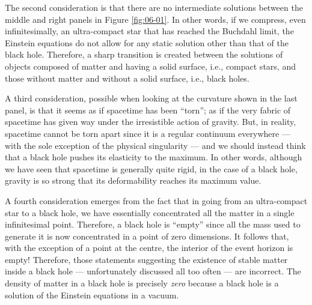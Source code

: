 The second consideration is that there are no intermediate solutions between the middle
and right panels in Figure \ref{fig:06-01}. In other words, if we compress, even infinitesimally, an
ultra-compact star that has reached the Buchdahl limit, the Einstein
equations do not allow for any static solution other than that of the black hole.
Therefore, a sharp transition is created between the solutions of objects composed of
matter and having a solid surface, i.e., compact stars, and those without matter and
without a solid surface, i.e., black holes.

A third consideration, possible when looking at the curvature shown in the last panel,
is that it seems as if spacetime has been ``torn''; as if the very fabric of spacetime
has given way under the irresistible action of gravity. But, in reality, spacetime
cannot be torn apart since it is a regular continuum everywhere --- with the sole
exception of the physical singularity --- and we should instead think
that a black hole pushes its elasticity to the maximum. In other words, although we have
seen that spacetime is generally quite rigid, in the case of a black hole, gravity is so
strong that its deformability reaches its maximum value.

A fourth consideration emerges from the fact that in going from an ultra-compact
star to a black hole, we have essentially concentrated all the matter
in a single infinitesimal point. Therefore, a black hole is ``empty'' since all the mass
used to generate it is now concentrated in a point of zero dimensions. It follows that,
with the exception of a point at the centre, the interior of the event
horizon is empty! Therefore, those statements suggesting the existence
of stable matter inside a black hole --- unfortunately discussed all too often --- are
incorrect. The density of matter in a black hole is precisely \emph{zero} because a
black hole is a solution of the Einstein equations in a vacuum.

